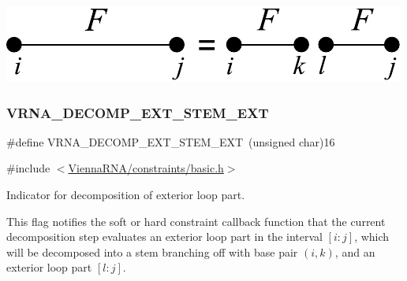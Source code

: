  
\begin{DoxyImageNoCaption}
  \mbox{\includegraphics[width=\textwidth,height=\textheight/2,keepaspectratio=true]{decomp_ext_ext_ext}}
\end{DoxyImageNoCaption}
 \mbox{\label{group__constraints_gabb09c5b78b75a44502fc77b950125c1e}} 
\subsubsection{\texorpdfstring{V\+R\+N\+A\+\_\+\+D\+E\+C\+O\+M\+P\+\_\+\+E\+X\+T\+\_\+\+S\+T\+E\+M\+\_\+\+E\+XT}{VRNA\_DECOMP\_EXT\_STEM\_EXT}}
{\footnotesize\ttfamily \#define V\+R\+N\+A\+\_\+\+D\+E\+C\+O\+M\+P\+\_\+\+E\+X\+T\+\_\+\+S\+T\+E\+M\+\_\+\+E\+XT~(unsigned char)16}



{\ttfamily \#include $<$\hyperlink{constraints_2basic_8h}{Vienna\+R\+N\+A/constraints/basic.\+h}$>$}



Indicator for decomposition of exterior loop part. 

This flag notifies the soft or hard constraint callback function that the current decomposition step evaluates an exterior loop part in the interval $[i:j]$, which will be decomposed into a stem branching off with base pair $(i,k)$, and an exterior loop part $[l:j]$.

